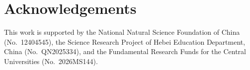 \documentclass[twocolumn,iicol,pdflatex,sn-mathphys-num]{sn-jnl}%
\begin{document}
\section{Acknowledgements}

This work is supported by the National Natural Science Foundation of China (No.~12404545), the Science Research Project of Hebei Education Department, China (No.~QN2025334), and the Fundamental Research Funds for the Central Universities (No.~2026MS144).


\end{document}
